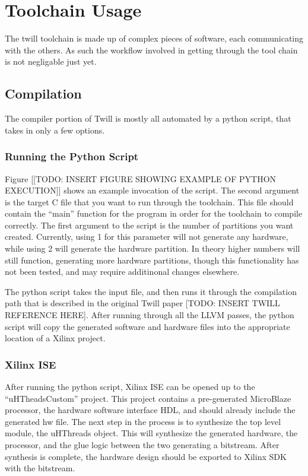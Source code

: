 \chapter{Toolchain Usage}
The twill toolchain is made up of complex pieces of software, each communicating with the others. As such the workflow involved in getting through the tool chain is not negligable just yet.

\section{Compilation}
The compiler portion of Twill is mostly all automated by a python script, that takes in only a few options. 

\subsection{Running the Python Script}
Figure [[TODO: INSERT FIGURE SHOWING EXAMPLE OF PYTHON EXECUTION]] shows an example invocation of the script. The second argument is the target C file that you want to run through the toolchain. This file should contain the ``main'' function for the program in order for the toolchain to compile correctly. The first argument to the script is the number of partitions you want created. Currently, using 1 for this parameter will not generate any hardware, while using 2 will generate the hardware partition. In theory higher numbers will still function, generating more hardware partitions, though this functionality has not been tested, and may require additinonal changes elsewhere.

The python script takes the input file, and then runs it through the compilation path that is described in the original Twill paper [TODO: INSERT TWILL REFERENCE HERE]. After running through all the LLVM passes, the python script will copy the generated software and hardware files into the appropriate location of a Xilinx project. 

\subsection{Xilinx ISE}
After running the python script, Xilinx ISE can be opened up to the ``uHTheadsCustom'' project. This project contains a pre-generated MicroBlaze processor, the hardware software interface HDL, and should already include the generated hw file. The next step in the process is to synthesize the top level module, the uHThreads object. This will synthesize the generated hardware, the processor, and the glue logic between the two generating a bitstream. After synthesis is complete, the hardware design should be exported to Xilinx SDK with the bitstream.

